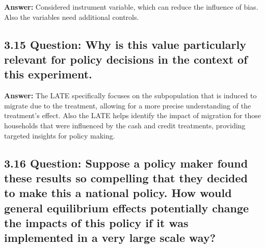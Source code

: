 \documentclass[
]{article}
\begin{document}
\textbf{Answer:} Considered instrument variable, which can reduce the
influence of bias. Also the variables need additional controls.

\clearpage

\hypertarget{question-why-is-this-value-particularly-relevant-for-policy-decisions-in-the-context-of-this-experiment.}{%
\subsection{\texorpdfstring{3.15 \textbf{Question: Why is this value
particularly relevant for policy decisions in the context of this
experiment.}}{3.15 Question: Why is this value particularly relevant for policy decisions in the context of this experiment.}}\label{question-why-is-this-value-particularly-relevant-for-policy-decisions-in-the-context-of-this-experiment.}}

\textbf{Answer:} The LATE specifically focuses on the subpopulation that
is induced to migrate due to the treatment, allowing for a more precise
understanding of the treatment's effect. Also the LATE helps identify
the impact of migration for those households that were influenced by the
cash and credit treatments, providing targeted insights for policy
making.

\clearpage

\hypertarget{question-suppose-a-policy-maker-found-these-results-so-compelling-that-they-decided-to-make-this-a-national-policy.-how-would-general-equilibrium-effects-potentially-change-the-impacts-of-this-policy-if-it-was-implemented-in-a-very-large-scale-way}{%
\subsection{\texorpdfstring{3.16 \textbf{Question: Suppose a policy
maker found these results so compelling that they decided to make this a
national policy. How would general equilibrium effects potentially
change the impacts of this policy if it was implemented in a very large
scale
way?}}{3.16 Question: Suppose a policy maker found these results so compelling that they decided to make this a national policy. How would general equilibrium effects potentially change the impacts of this policy if it was implemented in a very large scale way?}}\label{question-suppose-a-policy-maker-found-these-results-so-compelling-that-they-decided-to-make-this-a-national-policy.-how-would-general-equilibrium-effects-potentially-change-the-impacts-of-this-policy-if-it-was-implemented-in-a-very-large-scale-way}}
\end{document}
